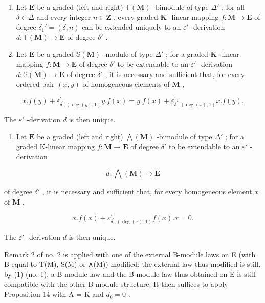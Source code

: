 \begin{enumerate}
\def\labelenumi{(\roman{enumi})}
\item
  Let \(\mathbf{E}\) be a graded (left and right) \(\mathsf{T}(\mathbf{M})\) -bimodule of type \(\Delta'\) ; for all \(\delta \in \Delta\) and every integer \(n \in \mathbf{Z}\) , every graded \(\mathbf{K}\) -linear mapping \(f: \mathbf{M} \to \mathbf{E}\) of degree \(\delta_1' = (\delta, n)\) can be extended uniquely to an \(\varepsilon'\) -derivation \(d: \mathsf{T}(\mathbf{M}) \to \mathbf{E}\) of degree \(\delta'\) .
\item
  Let \(\mathbf{E}\) be a graded \(\mathbb{S}(\mathbf{M})\) -module of type \(\Delta'\) ; for a graded \(\mathbf{K}\) -linear mapping \(f: \mathbf{M} \to \mathbf{E}\) of degree \(\delta'\) to be extendable to an \(\varepsilon'\) -derivation \(d: \mathbb{S}(\mathbf{M}) \to \mathbf{E}\) of degree \(\delta'\) , it is necessary and sufficient that, for every ordered pair \((x, y)\) of homogeneous elements of \(\mathbf{M}\) ,
\end{enumerate}

\[
x. f (y) + \varepsilon_ {\delta^ {\prime}, (\deg (y), 1)} ^ {\prime} y. f (x) = y. f (x) + \varepsilon_ {\delta^ {\prime}, (\deg (x), 1)} ^ {\prime} x. f (y).\tag{33}
\]

The \(\varepsilon'\) -derivation \(d\) is then unique.

\begin{enumerate}
\def\labelenumi{(\roman{enumi})}
\setcounter{enumi}{2}
\tightlist
\item
  Let \(\mathbf{E}\) be a graded (left and right) \(\bigwedge (\mathbf{M})\) -bimodule of type \(\Delta'\) ; for a graded K-linear mapping \(f: \mathbf{M} \to \mathbf{E}\) of degree \(\delta'\) to be extendable to an \(\varepsilon'\) -derivation
\end{enumerate}

\[
d: \bigwedge (\mathbf {M}) \rightarrow \mathbf {E}
\]

of degree \(\delta'\) , it is necessary and sufficient that, for every homogeneous element \(x\) of \(\mathbf{M}\) ,

\[
x. f (x) + \varepsilon_ {\delta ^ {\prime}, (\deg (x), 1)} ^ {\prime} f (x). x = 0.\tag{34}
\]

The \(\varepsilon'\) -derivation \(d\) is then unique.

Remark 2 of no. 2 is applied with one of the external B-module laws on E (with B equal to T(M), S(M) or ∧(M)) modified; the external law thus modified is still, by (1) (no. 1), a B-module law and the B-module law thus obtained on E is still compatible with the other B-module structure. It then suffices to apply Proposition 14 with A = K and \(d_{0} = 0\) .

